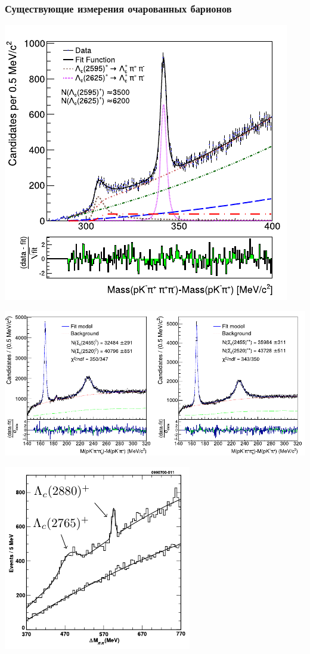 \documentclass[10pt]{beamer}
\begin{document}
\begin{frame}[label=measurements-overview]%
  \frametitle{Существующие измерения очарованных барионов}
  \centering
  \parbox{.41\linewidth}{ \centering
    \includegraphics[width=.7\linewidth]{figures/src/lc2595-2625-cdf}
  }
  \parbox{.58\linewidth}{ \centering
    \includegraphics[width=.8\linewidth]{figures/src/sc2455-2520-belle}
  }
  \vfill
  \parbox{.45\linewidth}{ \centering
    \includegraphics[width=.7\linewidth]{figures/lc2765-2880-cleo-mod}
}
\end{frame}
\end{document}
